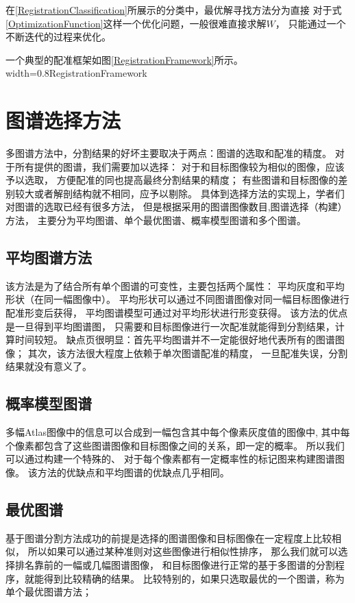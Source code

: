 在\ref{RegistrationClassification}所展示的分类中，最优解寻找方法分为直接
对于式\ref{OptimizationFunction}这样一个优化问题，一般很难直接求解$W$，
只能通过一个不断迭代的过程来优化。

一个典型的配准框架如图\ref{RegistrationFramework}所示。
%
{width=0.8\textwidth}{RegistrationFramework}



\section{图谱选择方法}%
多图谱方法中，分割结果的好坏主要取决于两点：图谱的选取和配准的精度。
对于所有提供的图谱，我们需要加以选择：
对于和目标图像较为相似的图像，应该予以选取，
方便配准的同也提高最终分割结果的精度；
有些图谱和目标图像的差别较大或者解剖结构就不相同，应予以剔除。
具体到选择方法的实现上，学者们对图谱的选取已经有很多方法，
但是根据采用的图谱图像数目,图谱选择（构建）方法，
主要分为平均图谱、单个最优图谱、概率模型图谱和多个图谱。

\subsection{平均图谱方法}
该方法是为了结合所有单个图谱的可变性，主要包括两个属性：
平均灰度和平均形状（在同一幅图像中）。
平均形状可以通过不同图谱图像对同一幅目标图像进行配准形变后获得，
平均图谱模型可通过对平均形状进行形变获得。
该方法的优点是一旦得到平均图谱图，
只需要和目标图像进行一次配准就能得到分割结果，计算时间较短。
缺点页很明显：首先平均图谱并不一定能很好地代表所有的图谱图像；
其次，该方法很大程度上依赖于单次图谱配准的精度，
一旦配准失误，分割结果就没有意义了。

\subsection{概率模型图谱}
多幅Atlas图像中的信息可以合成到一幅包含其中每个像素灰度值的图像中,
其中每个像素都包含了这些图谱图像和目标图像之间的关系，即一定的概率。
所以我们可以通过构建一个特殊的、
对于每个像素都有一定概率性的标记图来构建图谱图像。
该方法的优缺点和平均图谱的优缺点几乎相同。

\subsection{最优图谱}
基于图谱分割方法成功的前提是选择的图谱图像和目标图像在一定程度上比较相似，
所以如果可以通过某种准则对这些图像进行相似性排序，
那么我们就可以选择排名靠前的一幅或几幅图谱图像，
和目标图像进行正常的基于多图谱的分割程序，就能得到比较精确的结果。
比较特别的，如果只选取最优的一个图谱，称为单个最优图谱方法；

